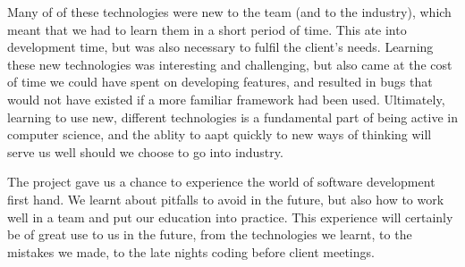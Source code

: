 \documentclass{l3proj}
\begin{document}
Many of of these technologies were new to the team (and to the industry),
 which meant that we had to learn them in a short period of time. This
 ate into development time, but was also necessary to fulfil the client's
 needs. Learning these new technologies was interesting and challenging,
 but also came at the cost of time we could have spent on developing
 features, and resulted in bugs that would not have existed if a more
 familiar framework had been used. Ultimately, learning to use new, different
 technologies is a fundamental part of being active in computer science,
 and the ablity to aapt quickly to new ways of thinking will serve us well
 should we choose to go into industry.

The project gave us a chance to experience the world of software development
 first hand. We learnt about pitfalls to avoid in the future, but also how
 to work well in a team and put our education into practice. This experience
 will certainly be of great use to us in the future, from the technologies we
 learnt, to the mistakes we made, to the late nights coding before client meetings.

\newpage

\end{document}
